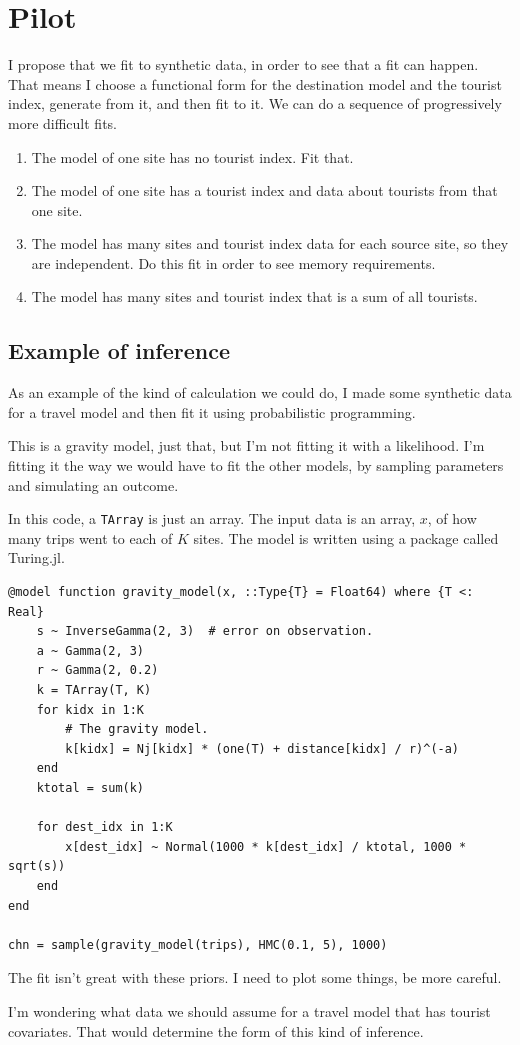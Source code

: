 \documentclass{article}
\begin{document}
\section{Pilot}
I propose that we fit to synthetic data, in order to see that a fit can happen. That means I choose a functional form for the destination model and the tourist index, generate from it, and then fit to it. We can do a sequence of progressively more difficult fits.
\begin{enumerate}
  \item The model of one site has no tourist index. Fit that.
  \item The model of one site has a tourist index and data about tourists from that one site.
  \item The model has many sites and tourist index data for each source site, so they are independent. Do this fit in order to see memory requirements.
  \item The model has many sites and tourist index that is a sum of all tourists.
  \end{enumerate}

\subsection{Example of inference}
As an example of the kind of calculation we could do, I made some synthetic data for a travel model and then fit it using probabilistic programming.

This is a gravity model, just that, but I'm not fitting it with a likelihood. I'm fitting it the way we would have to fit the other models, by sampling parameters and simulating an outcome.

In this code, a \verb|TArray| is just an array. The input data is an array, $x$,  of how many trips went to each of $K$ sites. The model is written using a package called Turing.jl.
\begin{lstlisting}
@model function gravity_model(x, ::Type{T} = Float64) where {T <: Real}
    s ~ InverseGamma(2, 3)  # error on observation.
    a ~ Gamma(2, 3)
    r ~ Gamma(2, 0.2)
    k = TArray(T, K)
    for kidx in 1:K
        # The gravity model.
        k[kidx] = Nj[kidx] * (one(T) + distance[kidx] / r)^(-a)
    end
    ktotal = sum(k)

    for dest_idx in 1:K
        x[dest_idx] ~ Normal(1000 * k[dest_idx] / ktotal, 1000 * sqrt(s))
    end
end

chn = sample(gravity_model(trips), HMC(0.1, 5), 1000)
\end{lstlisting}
The fit isn't great with these priors. I need to plot some things, be more careful.

I'm wondering what data we should assume for a travel model that has tourist covariates. That would determine the form of this kind of inference.



\end{document}

